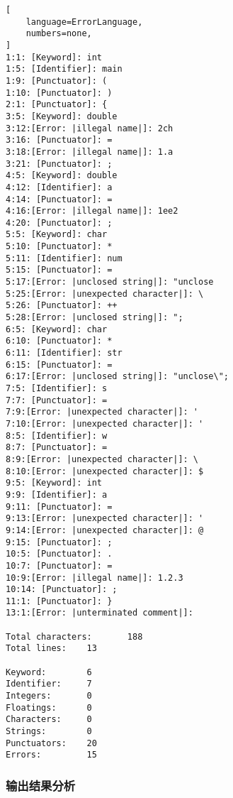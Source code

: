 \documentclass[lang=cn,11pt,a4paper]{elegantpaper}
\begin{document}
\begin{lstlisting}[
    language=ErrorLanguage,
    numbers=none,
]
1:1: [Keyword]: int
1:5: [Identifier]: main
1:9: [Punctuator]: (
1:10: [Punctuator]: )
2:1: [Punctuator]: {
3:5: [Keyword]: double
3:12:[Error: |illegal name|]: 2ch
3:16: [Punctuator]: =
3:18:[Error: |illegal name|]: 1.a
3:21: [Punctuator]: ;
4:5: [Keyword]: double
4:12: [Identifier]: a
4:14: [Punctuator]: =
4:16:[Error: |illegal name|]: 1ee2
4:20: [Punctuator]: ;
5:5: [Keyword]: char
5:10: [Punctuator]: *
5:11: [Identifier]: num
5:15: [Punctuator]: =
5:17:[Error: |unclosed string|]: "unclose
5:25:[Error: |unexpected character|]: \
5:26: [Punctuator]: ++
5:28:[Error: |unclosed string|]: ";
6:5: [Keyword]: char
6:10: [Punctuator]: *
6:11: [Identifier]: str
6:15: [Punctuator]: =
6:17:[Error: |unclosed string|]: "unclose\";
7:5: [Identifier]: s
7:7: [Punctuator]: =
7:9:[Error: |unexpected character|]: '
7:10:[Error: |unexpected character|]: '
8:5: [Identifier]: w
8:7: [Punctuator]: =
8:9:[Error: |unexpected character|]: \
8:10:[Error: |unexpected character|]: $
9:5: [Keyword]: int
9:9: [Identifier]: a
9:11: [Punctuator]: =
9:13:[Error: |unexpected character|]: '
9:14:[Error: |unexpected character|]: @
9:15: [Punctuator]: ;
10:5: [Punctuator]: .
10:7: [Punctuator]: =
10:9:[Error: |illegal name|]: 1.2.3
10:14: [Punctuator]: ;
11:1: [Punctuator]: }
13:1:[Error: |unterminated comment|]:

Total characters:       188
Total lines:    13

Keyword:        6
Identifier:     7
Integers:       0
Floatings:      0
Characters:     0
Strings:        0
Punctuators:    20
Errors:         15
\end{lstlisting}

\subsubsection{输出结果分析}
\end{document}
